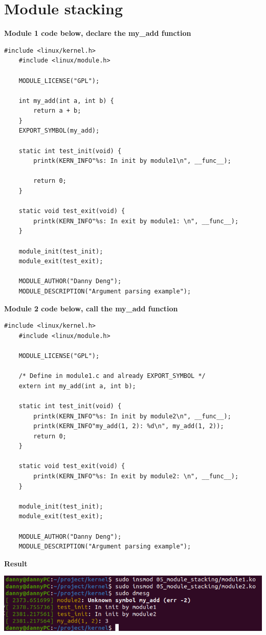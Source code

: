 \section{Module stacking}

\textbf{Module 1 code below, declare the my\_add function}
\newline
{}
\begin{lstlisting}[style=CStyle]
    #include <linux/kernel.h>
    #include <linux/module.h>
    
    MODULE_LICENSE("GPL");
    
    int my_add(int a, int b) {
        return a + b;
    }
    EXPORT_SYMBOL(my_add);
    
    static int test_init(void) {
        printk(KERN_INFO"%s: In init by module1\n", __func__);
    
        return 0;
    }
    
    static void test_exit(void) {
        printk(KERN_INFO"%s: In exit by module1: \n", __func__);
    }
    
    module_init(test_init);
    module_exit(test_exit);
    
    MODULE_AUTHOR("Danny Deng");
    MODULE_DESCRIPTION("Argument parsing example");    
\end{lstlisting}

\textbf{Module 2 code below, call the my\_add function}
\begin{lstlisting}[style=CStyle]
    #include <linux/kernel.h>
    #include <linux/module.h>

    MODULE_LICENSE("GPL");

    /* Define in module1.c and already EXPORT_SYMBOL */
    extern int my_add(int a, int b);

    static int test_init(void) {
        printk(KERN_INFO"%s: In init by module2\n", __func__);
        printk(KERN_INFO"my_add(1, 2): %d\n", my_add(1, 2));
        return 0;
    }

    static void test_exit(void) {
        printk(KERN_INFO"%s: In exit by module2: \n", __func__);
    }

    module_init(test_init);
    module_exit(test_exit);

    MODULE_AUTHOR("Danny Deng");
    MODULE_DESCRIPTION("Argument parsing example");
\end{lstlisting}




\textbf{Result}
\begin{center}
    \includegraphics[width=\linewidth]{images/05_module_stacking.png}
\end{center}



